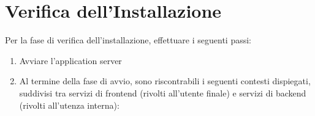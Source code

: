 \documentclass[letterpaper,10pt,italian]{sphinxmanual}
\begin{document}
\chapter{Verifica dell’Installazione}
\label{\detokenize{verifica/index:verifica-dell-installazione}}\label{\detokenize{verifica/index:inst-verifica}}\label{\detokenize{verifica/index::doc}}
Per la fase di verifica dell’installazione, effettuare i seguenti passi:
\begin{enumerate}
\item {} 
Avviare l’application server

\item {} 
Al termine della fase di avvio, sono riscontrabili i seguenti
contesti dispiegati, suddivisi tra servizi di frontend (rivolti
all’utente finale) e servizi di backend (rivolti all’utenza interna):

\end{enumerate}
\end{document}
